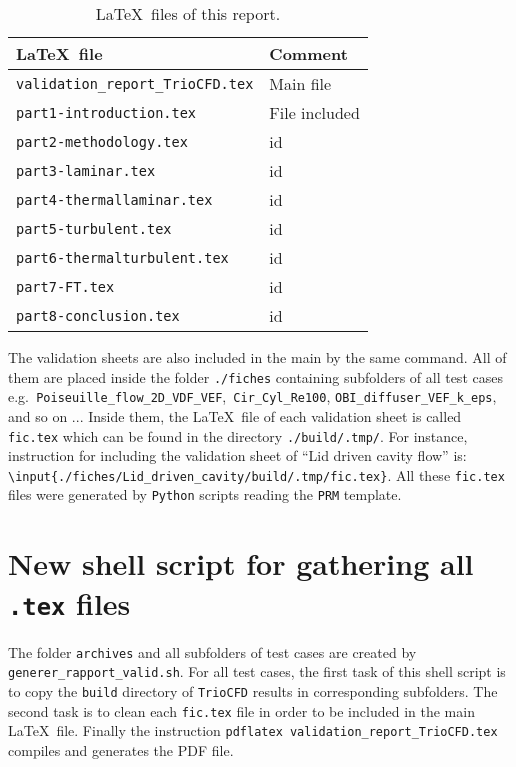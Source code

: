 \begin{table}[H]
\begin{centering}
\begin{tabular}{ll}
\hline 
\textbf{\LaTeX~file} & \textbf{Comment}\tabularnewline
\hline 
\texttt{validation\_report\_TrioCFD.tex} & Main file\tabularnewline
\texttt{part1-introduction.tex} & File included\tabularnewline
\texttt{part2-methodology.tex} & id\tabularnewline
\texttt{part3-laminar.tex} & id\tabularnewline
\texttt{part4-thermallaminar.tex} & id\tabularnewline
\texttt{part5-turbulent.tex} & id\tabularnewline
\texttt{part6-thermalturbulent.tex} & id\tabularnewline
\texttt{part7-FT.tex} & id\tabularnewline
\texttt{part8-conclusion.tex} & id\tabularnewline
\hline 
\end{tabular}
\par\end{centering}
\caption{\label{tab:LaTeX_files}\LaTeX~files of this report.}
\end{table}

The validation sheets are also included in the main by the same command.
All of them are placed inside the folder \texttt{./fiches} containing
subfolders of all test cases e.g.\texttt{ Poiseuille\_flow\_2D\_VDF\_VEF},\texttt{
Cir\_Cyl\_Re100}, \texttt{OBI\_diffuser\_VEF\_k\_eps}, and so on ...
Inside them, the \LaTeX~file of each validation sheet is called
\texttt{fic.tex} which can be found in the directory \texttt{./build/.tmp/}.
For instance, instruction for including the validation sheet of ``Lid
driven cavity flow'' is:\newline
\texttt{ \textbackslash{}input\{./fiches/Lid\_driven\_cavity/build/.tmp/fic.tex\}}.
All these \texttt{fic.tex} files were generated by \texttt{Python} scripts reading
the \texttt{PRM} template.
\section{\label{sec:Generating-the-report}New shell script for gathering all \texttt{.tex} files}
The folder \texttt{archives} and all subfolders of test cases are created
by \texttt{generer\_rapport\_valid.sh}. For all test cases, the
first task of this shell script is to copy the \texttt{build} directory
of \texttt{TrioCFD} results in corresponding subfolders. The second
task is to clean each \texttt{fic.tex} file in order to be included
in the main \LaTeX~file.
Finally the instruction \texttt{pdflatex validation\_report\_TrioCFD.tex}
compiles and generates the PDF file.

